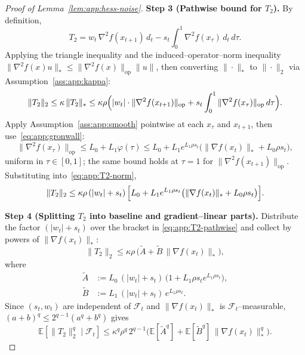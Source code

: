\documentclass[10pt,a4paper]{amsart}
\begin{document}
\begin{proof}[Proof of Lemma~\ref{lem:app:hess-noise}]
\smallskip\noindent\textbf{Step 3 (Pathwise bound for $T_2$).}
By definition,
\[
  T_2 = w_t\, \nabla^2 f(x_{t+1})\, d_t
    - s_t \int_0^1 \nabla^2 f(x_\tau)\, d_t\, d\tau.
\]
Applying the triangle inequality and the induced--operator--norm
inequality $\|\nabla^2 f(x) u\|_* \leq \|\nabla^2 f(x)\|_{\mathrm{op}}
\|u\|$, then converting $\|\cdot\|_*$ to $\|\cdot\|_2$ via
Assumption~\ref{ass:app:kappa}:
\begin{equation}
  \|T_2\|_2 \leq \kappa\, \|T_2\|_*
  \leq \kappa\rho\Bigl(|w_t|\cdot \|\nabla^2 f(x_{t+1})\|_{\mathrm{op}}
    + s_t \int_0^1 \|\nabla^2 f(x_\tau)\|_{\mathrm{op}}\, d\tau\Bigr).
  \label{eq:app:T2-norm}
\end{equation}
Apply Assumption~\ref{ass:app:smooth} pointwise at each $x_\tau$ and
$x_{t+1}$, then use~\eqref{eq:app:gronwall}:
\[
  \|\nabla^2 f(x_\tau)\|_{\mathrm{op}}
  \leq L_0 + L_1 \varphi(\tau)
  \leq L_0 + L_1 e^{L_1\rho s_t}\bigl(\|\nabla f(x_t)\|_* + L_0\rho s_t\bigr),
\]
uniform in $\tau \in [0,1]$; the same bound holds at $\tau = 1$ for
$\|\nabla^2 f(x_{t+1})\|_{\mathrm{op}}$. Substituting
into~\eqref{eq:app:T2-norm},
\begin{equation}
  \|T_2\|_2
  \leq \kappa\rho\, (|w_t| + s_t)\,\Bigl[L_0
    + L_1 e^{L_1\rho s_t}\bigl(\|\nabla f(x_t)\|_* + L_0 \rho s_t\bigr)\Bigr].
  \label{eq:app:T2-pathwise}
\end{equation}

\smallskip\noindent\textbf{Step 4 (Splitting $T_2$ into baseline and gradient--linear parts).}
Distribute the factor $(|w_t| + s_t)$ over the bracket in
\eqref{eq:app:T2-pathwise} and collect by powers of $\|\nabla
f(x_t)\|_*$:
\[
  \|T_2\|_2 \leq \kappa\rho\,\bigl(\widetilde A
    + \widetilde B\, \|\nabla f(x_t)\|_*\bigr),
\]
where
\begin{align}
  \widetilde A &:= L_0\, (|w_t| + s_t)\,
    \bigl(1 + L_1\rho s_t e^{L_1\rho s_t}\bigr),
  \label{eq:app:A-tilde} \\
  \widetilde B &:= L_1\, (|w_t| + s_t)\, e^{L_1\rho s_t}.
  \label{eq:app:B-tilde}
\end{align}
Since $(s_t, w_t)$ are independent of $\mathcal{F}_t$ and $\|\nabla
f(x_t)\|_*$ is $\mathcal{F}_t$--measurable, $(a+b)^q \leq 2^{q-1}(a^q +
b^q)$ gives
\begin{equation}
  \mathbb{E}[\|T_2\|_2^q \mid \mathcal{F}_t]
  \leq \kappa^q \rho^q\, 2^{q-1}
    \bigl(\mathbb{E}[\widetilde A^q]
      + \mathbb{E}[\widetilde B^q]\, \|\nabla f(x_t)\|_*^q\bigr).
  \label{eq:app:T2-cond}
\end{equation}


\end{proof}
\end{document}
